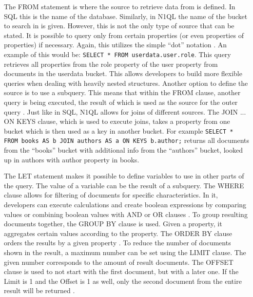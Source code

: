 The FROM statement is where the source to retrieve data from is defined. In SQL this is the name of the database. Similarly, in N1QL the name of the bucket to search in is given. However, this is not the only type of source that can be stated. It is possible to query only from certain properties (or even properties of properties) if necessary. Again, this utilizes the simple \enquote{dot} notation  \parencite{proCouchbaseServer}. An example of this would be: \texttt{SELECT * FROM userdata.user.role}. This query retrieves all properties from the role property of the user property from documents in the userdata bucket. This allows developers to build more flexible queries when dealing with heavily nested structures. Another option to define the source is to use a subquery. This means that within the FROM clause, another query is being executed, the result of which is used as the source for the outer query \parencite{couchbaseDocN1Ql}. Just like in SQL, N1QL allows for joins of different sources. The JOIN ... ON KEYS clause, which is used to execute joins, takes a property from one bucket which is then used as a key in another bucket. For example \texttt{SELECT * FROM books AS b JOIN authors AS a ON KEYS b.author;} returns all documents from the \enquote{books} bucket with additional info from the \enquote{authors} bucket, looked up in authors with author property in books.

The LET statement makes it possible to define variables to use in other parts of the query. The value of a variable can be the result of a subquery. The WHERE clause allows for filtering of documents for specific characteristics. In it, developers can execute calculations and create boolean expressions by comparing values or combining boolean values with AND or OR clauses \parencite{couchbaseDocN1Ql}. To group resulting documents together, the GROUP BY clause is used. Given a property, it aggregates certain values according to the property. The ORDER BY clause orders the results by a given property \parencite{proCouchbaseServer}. To reduce the number of documents shown in the result, a maximum number can be set using the LIMIT clause. The given number corresponds to the amount of result documents. The OFFSET clause is used to not start with the first document, but with a later one. If the Limit is 1 and the Offset is 1 as well, only the second document from the entire result will be returned \parencite{proCouchbaseDev}.
